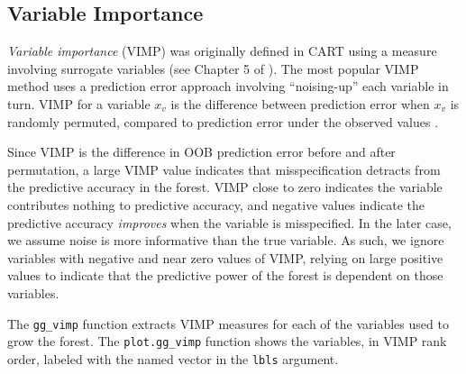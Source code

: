 \documentclass[article]{jss}
\begin{document}
\subsection{Variable Importance}\label{variable-importance}

\emph{Variable importance} (VIMP) was originally defined in CART using a
measure involving surrogate variables (see Chapter 5 of
\citep{cart:1984}). The most popular VIMP method uses a prediction error
approach involving ``noising-up'' each variable in turn. VIMP for a
variable \(x_v\) is the difference between prediction error when \(x_v\)
is randomly permuted, compared to prediction error under the observed
values \citep{Breiman:2001, Liaw:2002, Ishwaran:2007, Ishwaran:2008}.

Since VIMP is the difference in OOB prediction error before and after
permutation, a large VIMP value indicates that misspecification detracts
from the predictive accuracy in the forest. VIMP close to zero indicates
the variable contributes nothing to predictive accuracy, and negative
values indicate the predictive accuracy \emph{improves} when the
variable is misspecified. In the later case, we assume noise is more
informative than the true variable. As such, we ignore variables with
negative and near zero values of VIMP, relying on large positive values
to indicate that the predictive power of the forest is dependent on
those variables.

The \texttt{gg\_vimp} function extracts VIMP measures for each of the
variables used to grow the forest. The \texttt{plot.gg\_vimp} function
shows the variables, in VIMP rank order, labeled with the named vector
in the \texttt{lbls} argument.
\end{document}
